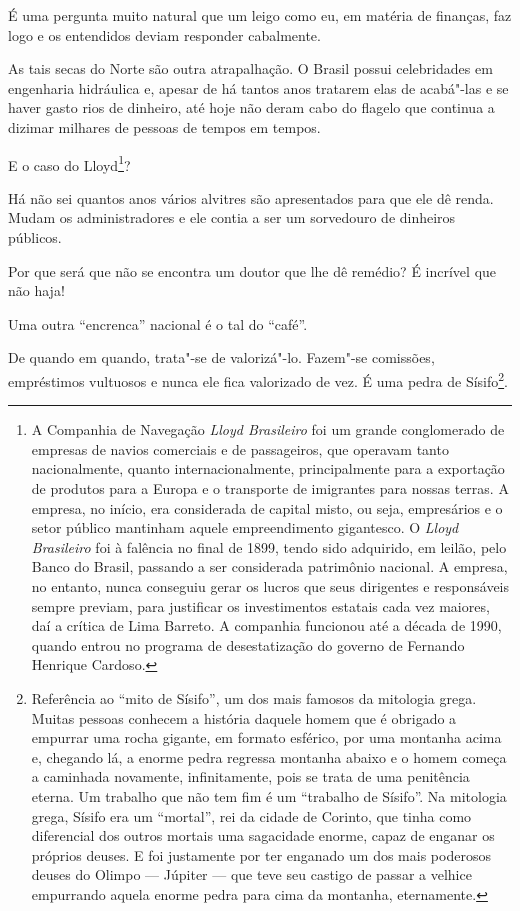 É uma pergunta muito natural que um leigo como eu, em matéria de
finanças, faz logo e os entendidos deviam responder cabalmente.

As tais secas do Norte são outra atrapalhação. O Brasil possui
celebridades em engenharia hidráulica e, apesar de há tantos anos
tratarem elas de acabá"-las e se haver gasto rios de dinheiro, até hoje
não deram cabo do flagelo que continua a dizimar milhares de pessoas de
tempos em tempos.

E o caso do Lloyd\footnote{A Companhia de Navegação \emph{Lloyd
  Brasileiro} foi um grande conglomerado de empresas de navios
  comerciais e de passageiros, que operavam tanto nacionalmente, quanto
  internacionalmente, principalmente para a exportação de produtos para
  a Europa e o transporte de imigrantes para nossas terras. A empresa,
  no início, era considerada de capital misto, ou seja, empresários e o
  setor público mantinham aquele empreendimento gigantesco. O
  \emph{Lloyd Brasileiro} foi à falência no final de 1899, tendo sido
  adquirido, em leilão, pelo Banco do Brasil, passando a ser considerada
  patrimônio nacional. A empresa, no entanto, nunca conseguiu gerar os
  lucros que seus dirigentes e responsáveis sempre previam, para
  justificar os investimentos estatais cada vez maiores, daí a crítica
  de Lima Barreto. A companhia funcionou até a década de 1990, quando
  entrou no programa de desestatização do governo de Fernando Henrique
  Cardoso.}?

Há não sei quantos anos vários alvitres são apresentados para que ele dê
renda. Mudam os administradores e ele contia a ser um sorvedouro de
dinheiros públicos.

Por que será que não se encontra um doutor que lhe dê remédio? É
incrível que não haja!

Uma outra ``encrenca'' nacional é o tal do ``café''.

De quando em quando, trata"-se de valorizá"-lo. Fazem"-se comissões,
empréstimos vultuosos e nunca ele fica valorizado de vez. É uma pedra de
Sísifo\footnote{Referência ao ``mito de Sísifo'', um dos mais famosos da
  mitologia grega. Muitas pessoas conhecem a história daquele homem que
  é obrigado a empurrar uma rocha gigante, em formato esférico, por uma
  montanha acima e, chegando lá, a enorme pedra regressa montanha abaixo
  e o homem começa a caminhada novamente, infinitamente, pois se trata
  de uma penitência eterna. Um trabalho que não tem fim é um ``trabalho
  de Sísifo''. Na mitologia grega, Sísifo era um ``mortal'', rei da
  cidade de Corinto, que tinha como diferencial dos outros mortais uma
  sagacidade enorme, capaz de enganar os próprios deuses. E foi
  justamente por ter enganado um dos mais poderosos deuses do Olimpo ---
  Júpiter --- que teve seu castigo de passar a velhice empurrando aquela
  enorme pedra para cima da montanha, eternamente.}.

